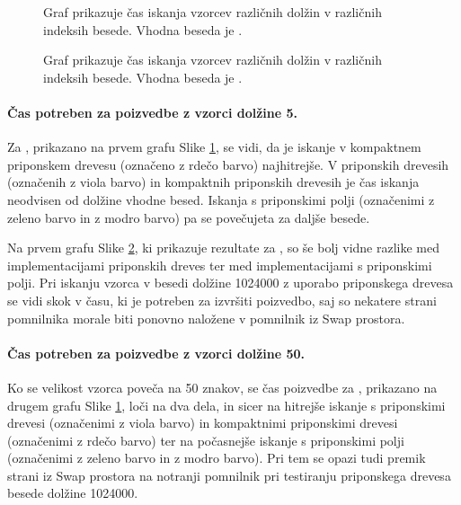 \begin{figure}[htb]
    \centering
    
    \caption{Graf prikazuje čas iskanja vzorcev različnih dolžin v različnih indeksih besede. Vhodna beseda je \DNK.} 
    \label{fig:IskanjeGraf}
\end{figure}

\begin{figure}[htb]
    \centering
    
    \caption{Graf prikazuje čas iskanja vzorcev različnih dolžin v različnih indeksih besede. Vhodna beseda je \NK.} 
    \label{fig:IskanjeGrafSLO}
\end{figure}

\paragraph{Čas potreben za poizvedbe z vzorci dolžine 5.}

Za \DNK, prikazano na prvem grafu Slike \ref{fig:IskanjeGraf}, se vidi, da je iskanje v kompaktnem priponskem drevesu (označeno z rdečo barvo) najhitrejše. V priponskih drevesih (označenih z viola barvo) in kompaktnih priponskih drevesih je čas iskanja neodvisen od dolžine vhodne besed. Iskanja s priponskimi polji (označenimi z zeleno barvo in z modro barvo) pa se povečujeta za daljše besede.

Na prvem grafu Slike \ref{fig:IskanjeGrafSLO}, ki prikazuje rezultate za \NK, so še bolj vidne razlike med implementacijami priponskih dreves ter med implementacijami s priponskimi polji. Pri iskanju vzorca v besedi dolžine 1024000 z uporabo priponskega drevesa se vidi skok v času, ki je potreben za izvršiti poizvedbo, saj so nekatere strani pomnilnika morale biti ponovno naložene v pomnilnik iz Swap prostora.

\paragraph{Čas potreben za poizvedbe z vzorci dolžine 50.}

Ko se velikost vzorca poveča na 50 znakov, se čas poizvedbe za \DNK, prikazano na drugem grafu Slike \ref{fig:IskanjeGraf}, loči na dva dela, in sicer na hitrejše iskanje s priponskimi drevesi (označenimi z viola barvo) in kompaktnimi priponskimi drevesi (označenimi z rdečo barvo) ter na počasnejše iskanje s priponskimi polji (označenimi z zeleno barvo in z modro barvo). Pri tem se opazi tudi premik strani iz Swap prostora na notranji pomnilnik pri testiranju priponskega drevesa besede dolžine 1024000.

